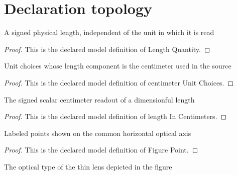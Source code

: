 \section{Declaration topology}
\begin{definition}
  \label{def:physics:phyx-mini-0035:phyxminiproblems-problemphyxmini0035-lengthquantity}
  A signed physical length, independent of the unit in which it is read
\end{definition}
\begin{proof}
  This is the declared model definition of Length Quantity.
\end{proof}
\begin{definition}
  \label{def:physics:phyx-mini-0035:phyxminiproblems-problemphyxmini0035-centimeterunitchoices}
  Unit choices whose length component is the centimeter used in the source
\end{definition}
\begin{proof}
  This is the declared model definition of centimeter Unit Choices.
\end{proof}
\begin{definition}
  \label{def:physics:phyx-mini-0035:phyxminiproblems-problemphyxmini0035-lengthincentimeters}
  The signed scalar centimeter readout of a dimensionful length
\end{definition}
\begin{proof}
  This is the declared model definition of length In Centimeters.
\end{proof}
\begin{definition}
  \label{def:physics:phyx-mini-0035:phyxminiproblems-problemphyxmini0035-figurepoint}
  Labeled points shown on the common horizontal optical axis
\end{definition}
\begin{proof}
  This is the declared model definition of Figure Point.
\end{proof}
\begin{definition}
  \label{def:physics:phyx-mini-0035:phyxminiproblems-problemphyxmini0035-thinlenskind}
  The optical type of the thin lens depicted in the figure
\end{definition}
